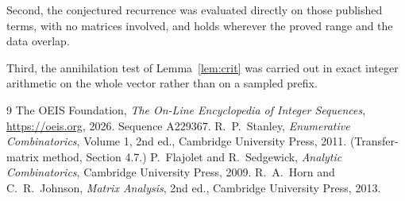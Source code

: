 \documentclass[11pt,a4paper]{article}
\theoremstyle{plain}
\theoremstyle{definition}
\begin{document}
Second, the conjectured recurrence was evaluated directly on those published terms, with no
matrices involved, and holds wherever the proved range and the data overlap.

Third, the annihilation test of Lemma~\ref{lem:crit} was carried out in exact integer
arithmetic on the whole vector rather than on a sampled prefix.

\begin{thebibliography}{9}
 The OEIS Foundation, \emph{The On-Line Encyclopedia of Integer
Sequences}, \url{https://oeis.org}, 2026. Sequence A229367.
 R.~P.~Stanley, \emph{Enumerative Combinatorics}, Volume 1, 2nd ed.,
Cambridge University Press, 2011. (Transfer-matrix method, Section 4.7.)
 P.~Flajolet and R.~Sedgewick, \emph{Analytic Combinatorics}, Cambridge
University Press, 2009.
 R.~A.~Horn and C.~R.~Johnson, \emph{Matrix Analysis}, 2nd ed., Cambridge
University Press, 2013.
\end{thebibliography}
\end{document}
